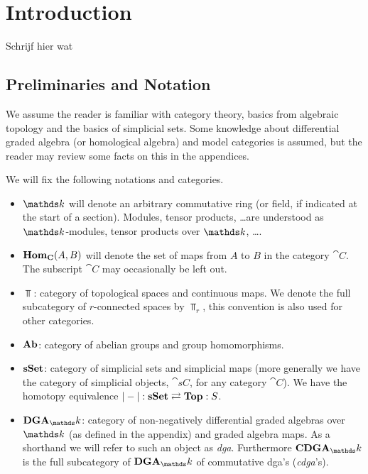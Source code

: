 
\chapter*{Introduction}

Schrijf hier wat

\section{Preliminaries and Notation}

We assume the reader is familiar with category theory, basics from algebraic topology and the basics of simplicial sets. Some knowledge about differential graded algebra (or homological algebra) and model categories is assumed, but the reader may review some facts on this in the appendices.

We will fix the following notations and categories.
\begin{itemize}
	\item $\k$ will denote an arbitrary commutative ring (or field, if indicated at the start of a section). Modules, tensor products, \dots are understood as $\k$-modules, tensor products over $\k$, \dots.
	\item $\mathbf{Hom}_{\mathbf{C}}(A, B)$ will denote the set of maps from $A$ to $B$ in the category $\cat{C}$. The subscript $\cat{C}$ may occasionally be left out.
	\item $\Top$: category of topological spaces and continuous maps. We denote the full subcategory of $r$-connected spaces by $\Top_r$, this convention is also used for other categories.
	\item $\mathbf{Ab}$: category of abelian groups and group homomorphisms.
	\item $\mathbf{s{\mathbf{Set}}}$: category of simplicial sets and simplicial maps (more generally we have the category of simplicial objects, $\cat{sC}$, for any category $\cat{C}$). We have the homotopy equivalence $|-| : \mathbf{s{\mathbf{Set}}} \rightleftarrows \mathbf{Top} : S$.
	\item $\DGA_\k$: category of non-negatively differential graded algebras over $\k$ (as defined in the appendix) and graded algebra  maps. As a shorthand we will refer to such an object as \emph{dga}. Furthermore $\CDGA_\k$ is the full subcategory of $\DGA_\k$ of commutative dga's (\emph{cdga}'s).
\end{itemize}

\tableofcontents
{}
